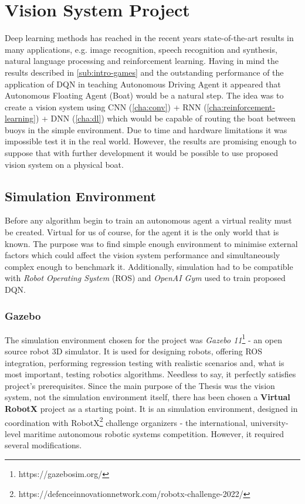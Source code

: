 \chapter{Vision System Project}
\label{cha:vision-system-project}

Deep learning methods has reached in the recent years state-of-the-art results in many applications, e.g. image recognition, speech recognition and synthesis, natural language processing and reinforcement learning. Having in mind the results described in \ref{sub:intro-games} and the outstanding performance of the application of DQN in teaching Autonomous Driving Agent \cite{2020DuckieTown} it appeared that Autonomous Floating Agent (Boat) would be a natural step. The idea was to create a vision system using CNN (\ref{cha:conv}) + RNN (\ref{cha:reinforcement-learning}) + DNN (\ref{cha:dl}) which would be capable of routing the boat between buoys in the simple environment. Due to time and hardware limitations it was impossible test it in the real world. However, the results are promising enough to suppose that with further development it would be possible to use proposed vision system on a physical boat.

\section{Simulation Environment}
\label{sec:simulation-env}

Before any algorithm begin to train an autonomous agent a virtual reality must be created. Virtual for us of course, for the agent it is the only world that is known. The purpose was to find simple enough environment to minimise external factors which could affect the vision system performance and simultaneously complex enough to benchmark it. Additionally, simulation had to be compatible with \emph{Robot Operating System} (ROS) and \emph{OpenAI Gym} used to train proposed DQN. 

\subsection{Gazebo}
\label{sub:gazebo}

The simulation environment chosen for the project was \emph{Gazebo 11}\footnote{https://gazebosim.org/} - an open source robot 3D simulator.
It is used for designing robots, offering ROS integration, performing regression testing with realistic scenarios and, what is most important, testing robotics algorithms. Needless to say, it perfectly satisfies project's prerequisites. Since the main purpose of the Thesis was the vision system, not the simulation environment itself, there has been chosen a \textbf{Virtual RobotX} \cite{bingham19toward} project as a starting point. It is an simulation environment, designed in coordination with RobotX\footnote{https://defenceinnovationnetwork.com/robotx-challenge-2022/} challenge organizers - the international, university-level maritime autonomous robotic systems competition. However, it required several modifications.

